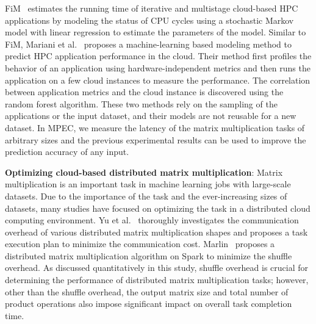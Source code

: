 \documentclass[10pt, conference, compsocconf]{IEEEtran}
\begin{document}
FiM~\cite{fim} estimates the running time of iterative and multistage cloud-based HPC applications by modeling the status of CPU cycles using a stochastic Markov model with linear regression to estimate the parameters of the model. Similar to FiM, Mariani et al.~\cite{hpc-cloud-predict} proposes a machine-learning based modeling method to predict HPC application performance in the cloud. Their method first profiles the behavior of an application using hardware-independent metrics and then runs the application on a few cloud instances to measure the performance. The correlation between application metrics and the cloud instance is discovered using the random forest algorithm. These two methods rely on the sampling of the applications or the input dataset, and their models are not reusable for a new dataset. In MPEC, we measure the latency of the matrix multiplication tasks of arbitrary sizes and the previous experimental results can be used to improve the prediction accuracy of any input.

\textbf{Optimizing cloud-based distributed matrix multiplication}: Matrix multiplication is an important task in machine learning jobs with large-scale datasets. Due to the importance of the task and the ever-increasing sizes of datasets, many studies have focused on optimizing the task in a distributed cloud computing environment. Yu et al.~\cite{matmult-overhead-profiling} thoroughly investigates the communication overhead of various distributed matrix multiplication shapes and proposes a task execution plan to minimize the communication cost. Marlin~\cite{marlin} proposes a distributed matrix multiplication algorithm on Spark to minimize the shuffle overhead. As discussed quantitatively in this study, shuffle overhead is crucial for determining the performance of distributed matrix multiplication tasks; however, other than the shuffle overhead, the output matrix size and total number of product operations also impose significant impact on overall task completion time.
\end{document}
